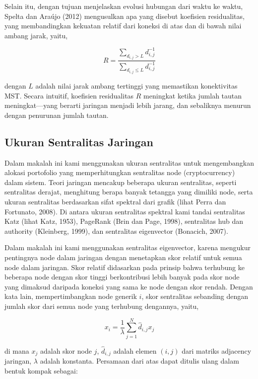 \documentclass[12pt,a4paper]{article}
\begin{document}
Selain itu, dengan tujuan menjelaskan evolusi hubungan dari waktu ke waktu, Spelta dan Araújo (2012)\cite{spelta2012} mengusulkan apa yang disebut koefisien residualitas, yang membandingkan kekuatan relatif dari koneksi di atas dan di bawah nilai ambang jarak, yaitu,

\begin{equation}
R = \frac{\sum_{d_{i,j} > L} d_{i,j}^{-1}}{\sum_{d_{i,j} \leq L} d_{i,j}^{-1}}
\end{equation}

dengan $L$ adalah nilai jarak ambang tertinggi yang memastikan konektivitas MST. Secara intuitif, koefisien residualitas $R$ meningkat ketika jumlah tautan meningkat—yang berarti jaringan menjadi lebih jarang, dan sebaliknya menurun dengan penurunan jumlah tautan.

\subsection{Ukuran Sentralitas Jaringan}

Dalam makalah ini kami menggunakan ukuran sentralitas untuk mengembangkan alokasi portofolio yang memperhitungkan sentralitas node (cryptocurrency) dalam sistem. Teori jaringan mencakup beberapa ukuran sentralitas, seperti sentralitas derajat, menghitung berapa banyak tetangga yang dimiliki node, serta ukuran sentralitas berdasarkan sifat spektral dari grafik (lihat Perra dan Fortunato, 2008)\cite{perra2008}. Di antara ukuran sentralitas spektral kami tandai sentralitas Katz (lihat Katz, 1953)\cite{katz1953}, PageRank (Brin dan Page, 1998)\cite{brin1998}, sentralitas hub dan authority (Kleinberg, 1999)\cite{kleinberg1999}, dan sentralitas eigenvector (Bonacich, 2007)\cite{bonacich2007}.

Dalam makalah ini kami menggunakan sentralitas eigenvector, karena mengukur pentingnya node dalam jaringan dengan menetapkan skor relatif untuk semua node dalam jaringan. Skor relatif didasarkan pada prinsip bahwa terhubung ke beberapa node dengan skor tinggi berkontribusi lebih banyak pada skor node yang dimaksud daripada koneksi yang sama ke node dengan skor rendah. Dengan kata lain, mempertimbangkan node generik $i$, skor sentralitas sebanding dengan jumlah skor dari semua node yang terhubung dengannya, yaitu,

\begin{equation}
x_i = \frac{1}{\lambda} \sum_{j=1}^{N} \hat{d}_{i,j} x_j
\end{equation}

di mana $x_j$ adalah skor node $j$, $\hat{d}_{i,j}$ adalah elemen $(i, j)$ dari matriks adjacency jaringan, $\lambda$ adalah konstanta. Persamaan dari atas dapat ditulis ulang dalam bentuk kompak sebagai:
\end{document}
